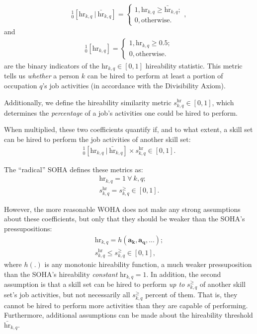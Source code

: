 \documentclass{elsarticle} %
\begin{document}
\begin{gather}
    _{0}^{1}[\text{hr}_{k,q} \ |\ \bar{\text{hr}}_{k,q}] = 
    \begin{cases}
        1, \text{$\text{hr}_{k,q} \geq \bar{\text{hr}}_{k,q}$}; \\
        0, \text{otherwise}.
    \end{cases}
    ,
\end{gather}
and 
\begin{gather}
    _{0}^{1}[\text{hr}_{k,q}] = 
    \begin{cases}
        1, \text{$\text{hr}_{k,q} \geq 0.5$}; \\
        0, \text{otherwise}.
    \end{cases}
\end{gather}
are the binary indicators of the $\text{hr}_{k,q} \in [0,1]$ hireability statistic. This metric tells us \textit{whether} a person $k$ can be hired to perform at least a portion of occupation $q$'s job activities (in accordance with the Divisibility Axiom).

Additionally, we define the hireability similarity metric $s_{k,q}^{\text{hr}} \in [0,1]$, which determines the \textit{percentage} of a job's activities one could be hired to perform.

When multiplied, these two coefficients quantify if, and to what extent, a skill set can be hired to perform the job activities of another skill set:
\begin{gather}
    _{0}^{1}[\text{hr}_{k,q} \ |\ \bar{\text{hr}}_{k,q}] \times s_{k,q}^{\text{hr}}
    \in [0,1]
    .
\end{gather}

The ``radical'' SOHA defines these metrics as:
\begin{gather}
    \text{hr}_{k,q} = 1 \ \forall \ k,q;\\
    s_{k,q}^{\text{hr}} = s_{k,q}^{\geq}
    \in [0,1]
    .
\end{gather}

However, the more reasonable WOHA does not make any strong assumptions about these coefficients, but only that they should be weaker than the SOHA's pressupositions:
\begin{gather}
    \text{hr}_{k,q} = h(\boldsymbol{a_{k}}, \boldsymbol{a_{q}}, ...);\\
    s_{k,q}^{\text{hr}} \leq s_{k,q}^{\geq}
    \in [0,1]
    ,
\end{gather}
where $h(.)$ is any monotonic hireability function, a much weaker pressuposition than the SOHA's hireability \textit{constant} $\text{hr}_{k,q} = 1$. In addition, the second assumption is that a skill set can be hired to perform \textit{up to} $s_{k,q}^{\geq}$ of another skill set's job activities, but not necessarily all $s_{k,q}^{\geq}$ percent of them. That is, they cannot be hired to perform more activities than they are capable of performing. Furthermore, additional assumptions can be made about the hireability threshold $\bar{\text{hr}}_{k,q}$.
\end{document}
